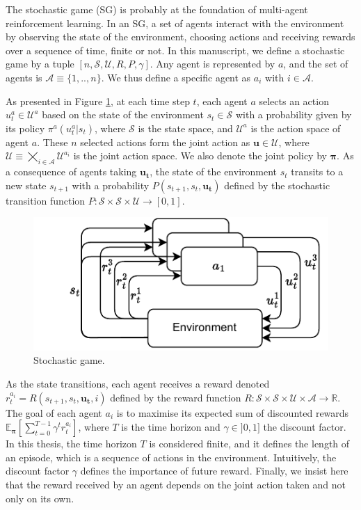 
The stochastic game (SG) \citep{stochasticGames} is probably at the foundation of multi-agent reinforcement learning.
In an SG, a set of agents interact with the environment by observing the state of the environment, choosing actions and receiving rewards over a sequence of time, finite or not.
In this manuscript, we define a stochastic game by a tuple $[n, \mathcal{S}, \mathcal{U}, R, P, \gamma]$.
Any agent is represented by $a$, and the set of agents is $\mathcal{A} \equiv \{1,..,n\}$.
We thus define a specific agent as $a_i$ with $i \in \mathcal{A}$.

As presented in Figure \ref{fig:ch2_sg}, at each time step $t$, each agent $a$ selects an action $u_t^a \in \mathcal{U}^a$ based on the state of the environment $s_t \in \mathcal{S}$ with a probability given by its policy $\pi^a(u^a_t|s_t)$, where $\mathcal{S}$ is the state space, and $\mathcal{U}^a$ is the action space of agent $a$.
These $n$ selected actions form the joint action as $\mathbf{u} \in \mathcal{U}$, where $\mathcal{U} \equiv \bigtimes_{i \in \mathcal{A}} \mathcal{U}^{a_i}$ is the joint action space.
We also denote the joint policy by $\mathbf{\pi}$.
As a consequence of agents taking $\mathbf{u_t}$, the state of the environment $s_t$ transits to a new state $s_{t+1}$ with a probability $P(s_{t+1}, s_t, \mathbf{u_t})$ defined by the stochastic transition function $P:\mathcal{S} \times \mathcal{S} \times \mathcal{U} \rightarrow [0,1]$.

\begin{figure}
    \centering
    \includegraphics[width=.8\textwidth]{tex_thesis/figures/ch2/SG.pdf}
    \caption{Stochastic game.}
    \label{fig:ch2_sg}
\end{figure}

As the state transitions, each agent receives a reward denoted $r_t^{a_i} = R(s_{t+1}, s_t, \mathbf{u_t}, i)$ defined by the reward function $R: \mathcal{S} \times \mathcal{S} \times \mathcal{U} \times \mathcal{A} \rightarrow \mathbb{R}$.
The goal of each agent $a_i$ is to maximise its expected sum of discounted rewards $\mathbb{E}_{\mathbf{\pi}}\left[ \sum_{t=0}^{T-1} \gamma^t r^{a_i}_t \right]$, where $T$ is the time horizon and $\gamma \in ]0, 1]$ the discount factor.
In this thesis, the time horizon $T$ is considered finite, and it defines the length of an episode, which is a sequence of actions in the environment.
Intuitively, the discount factor $\gamma$ defines the importance of future reward.
Finally, we insist here that the reward received by an agent depends on the joint action taken and not only on its own.

